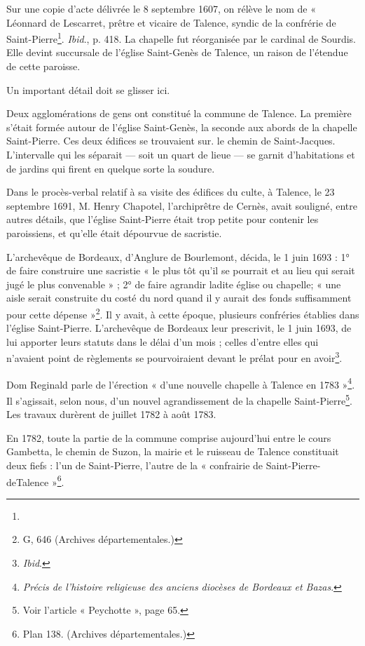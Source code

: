 Sur une copie d'acte délivrée le 8 septembre 1607, on rélève le nom de « Léonnard de Lescarret, prêtre et vicaire de Talence, syndic de la confrérie de Saint-Pierre\footnote{}.
\textit{Ibid}., p. 418.
La chapelle fut réorganisée par le cardinal de Sourdis. Elle devint succursale de l'église Saint-Genès de Talence, un raison de l'étendue de cette paroisse. 

Un important détail doit se glisser ici.

Deux agglomérations de gens ont constitué la commune de Talence. La première s'était formée autour de l'église Saint-Genès, la seconde aux abords de la chapelle Saint-Pierre. Ces deux édifices se trouvaient sur. le chemin de Saint-Jacques. L'intervalle qui les séparait — soit un quart de lieue — se garnit d'habitations et de jardins qui firent en quelque sorte la soudure.

Dans le procès-verbal relatif à sa visite des édifices du culte, à Talence, le 23 septembre 1691, M. Henry Chapotel, l'archiprêtre de Cernès, avait souligné, entre autres détails, que l'église Saint-Pierre était trop petite pour contenir les paroissiens, et qu'elle était dépourvue de sacristie.

L'archevêque de Bordeaux, d'Anglure de Bourlemont, décida, le 1\ier{} juin 1693 : 1° de faire construire une sacristie « le plus tôt qu'il se pourrait et au lieu qui serait jugé le plus convenable » ; 2° de faire agrandir ladite église ou chapelle; « une aisle serait construite du costé du nord quand il y aurait des fonds suffisamment pour cette dépense »\footnote{G, 646 (Archives départementales.)}. Il y avait, à cette époque, plusieurs confréries établies dans l'église Saint-Pierre. L'archevêque de Bordeaux leur prescrivit, le 1\ier{} juin 1693, de lui apporter leurs statuts dans le délai d'un mois ; celles d'entre elles qui n'avaient point de règlements se pourvoiraient devant le prélat pour en avoir\footnote{\textit{Ibid}.}.

Dom Reginald parle de l'érection « d'une nouvelle chapelle à Talence en 1783 »\footnote{\textit{Précis de l'histoire religieuse des anciens diocèses de Bordeaux et Bazas}.}. Il s'agissait, selon nous, d'un nouvel agrandissement de la chapelle Saint-Pierre\footnote{Voir l'article « Peychotte », page 65.}. Les travaux durèrent de juillet 1782 à août 1783.

En 1782, toute la partie de la commune comprise aujourd'hui entre le cours Gambetta, le chemin de Suzon, la mairie et le ruisseau de Talence constituait deux fiefs : l'un de Saint-Pierre, l'autre de la « confrairie de Saint-Pierre-deTalence »\footnote{Plan 138. (Archives départementales.)}.

